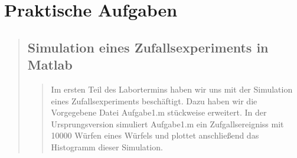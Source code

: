 \section{Praktische Aufgaben}
\begin{quote}
    \subsection{Simulation eines Zufallsexperiments in Matlab}
    \begin{quote}
        Im ersten Teil des Labortermins haben wir uns mit der Simulation eines Zufallsexperiments beschäftigt. Dazu
        haben wir die Vorgegebene Datei Aufgabe1.m stückweise erweitert. In der Ursprungsversion simuliert Aufgabe1.m
        ein Zufgallsereigniss mit 10000 Würfen eines Würfels und plottet anschließend das Histogramm dieser
        Simulation.\\
        

\end{quote}
\end{quote}
